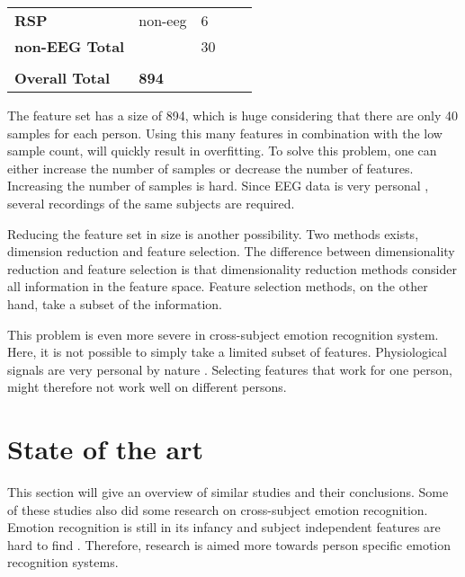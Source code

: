 \begin{table}[H]
\begin{tabular}{lllll}
\textbf{RSP}            & non-eeg       & 6                             &                           &              \\
\textbf{non-EEG Total}  &               & 30                            &                           &              \\
                        &               &                               &                           &              \\
\textbf{Overall Total}  & \textbf{894}  &                               &                           &             
\end{tabular}
\end{table}

The feature set has a size of 894, which is huge considering that there are only 40 samples for each person. Using this many features in combination with the low sample count, will quickly result in overfitting\citep{prml}. To solve this problem, one can either increase the number of samples or decrease the number of features. Increasing the number of samples is hard. Since EEG data is very personal \citep{DEAP}, several recordings of the same subjects are required. 

\npar

Reducing the feature set in size is another possibility. Two methods exists, dimension reduction and feature selection. The difference between dimensionality reduction and feature selection is that dimensionality reduction methods consider all information in the feature space. Feature selection methods, on the other hand, take a subset of the information\citep{PhytoEm}.

\npar

This problem is even more severe in cross-subject emotion recognition system. Here, it is not possible to simply take a limited subset of features. Physiological signals are very personal by nature \citep{DEAP}. Selecting features that work for one person, might therefore not work well on different persons.

\section{State of the art}
\label{sota}
This section will give an overview of similar studies and their conclusions. Some of these studies also did some research on cross-subject emotion recognition. Emotion recognition is still in its infancy\citep{emorecoghard} and subject independent features are hard to find \citep{DEAP}. Therefore, research is aimed more towards person specific emotion recognition systems.

